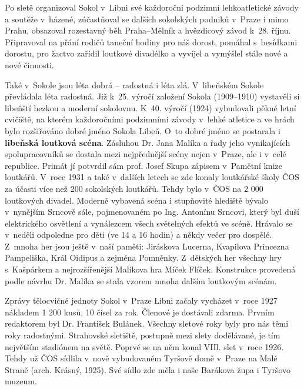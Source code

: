 \documentclass[a5paper, 11pt, twoside]{article}
\begin{document}
Po sletě organizoval Sokol v~Libni své každoroční podzimní
lehkoatletické závody a soutěže v~házené, zúčastňoval se dalších
sokolských podniků v~Praze i mimo Prahu, obsazoval rozestavný běh
Praha--Mělník a hvězdicový závod k~28. říjnu. Připravoval na přání
rodičů taneční hodiny pro náš dorost, pomáhal s~besídkami dorostu, pro
žactvo zařídil loutkové divadélko a vyvíjel a vymýšlel stále nové a nové
činnosti.

Také v~Sokole jsou léta dobrá --⁠⁠⁠⁠⁠⁠ radostná i léta zlá. V~libeňském Sokole
převládala léta radostná. Již k~25. výročí založení Sokola
(1909--1910) vystavěli si libeňští hezkou a moderní
sokolovnu. K~40. výročí (1924) vybudovali pěkné letní cvičiště, na
kterém každoročními podzimními závody v~lehké atletice a ve hrách bylo
rozšiřováno dobré jméno Sokola Libeň. O~to dobré jméno se postarala i
\textbf{libeňská loutková scéna}. Zásluhou Dr. Jana Malíka a řady jeho
vynikajících spolupracovníků se dostala mezi nejpřednější scény nejen
v~Praze, ale i v~celé republice. Primát jí potvrdil sám prof. Josef Skupa
zápisem v~Pamětní knize loutkářů. V~roce 1931 a také v~dalších letech se
zde konaly loutkářské školy ČOS za účasti více než 200 sokolských
loutkářů. Tehdy bylo v~ČOS na 2 000 loutkových divadel. Moderně vybavená
scéna i stupňovité hlediště bývalo v~nynějším Srncově sále, pojmenovaném
po Ing. Antonínu Srncovi, který byl duší elektrického osvětlení a
vynálezcem všech světelných efektů ve scéně. Hrávalo se v~neděli
odpoledne pro děti (ve 14 a 16 hodin) a někdy večer pro dospělé. Z~mnoha
her jsou ještě v~naší paměti: Jiráskova Lucerna, Kvapilova Princezna
Pampeliška, Král Oidipus a zejména Pomněnky. Z~dětských her všechny hry
s~Kašpárkem a nejrozšířenější Malíkova hra Míček Flíček. Konstrukce
provedená podle návrhu Dr. Malíka se stala vzorem mnoha dalším loutkovým
scénám.

Zprávy tělocvičné jednoty Sokol v~Praze Libni začaly vycházet v~roce
1927 nákladem 1 200 kusů, 10 čísel za rok. Členové je dostávali zdarma.
Prvním redaktorem byl Dr. František Bulánek. Všechny sletové roky byly
pro nás těmi roky radostnými. Strahovské sletiště, postupně mezi slety
dodělávané, je tím největším stadiónem na světě. Poprvé se na něm konal
VIIl. slet v~roce 1926. Tehdy už ČOS sídlila v~nově vybudovaném Tyršově
domě v~Praze na Malé Straně (arch. Krásný, 1925). Své sídlo zde měla i
naše Barákova župa i Tyršovo muzeum.
\end{document}
